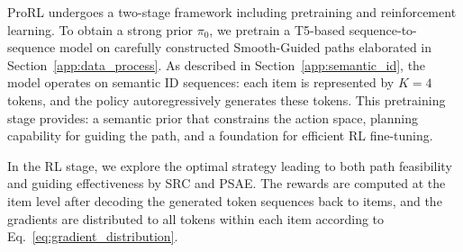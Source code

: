 ProRL undergoes a two-stage framework including pretraining and reinforcement learning. To obtain a strong prior $\pi_0$, we pretrain a T5-based sequence-to-sequence model on carefully constructed Smooth-Guided paths elaborated in Section~\ref{app:data_process}. As described in Section~\ref{app:semantic_id}, the model operates on semantic ID sequences: each item is represented by $K=4$ tokens, and the policy autoregressively generates these tokens. This pretraining stage provides: a semantic prior that constrains the action space, planning capability for guiding the path, and a foundation for efficient RL fine-tuning.

In the RL stage, we explore the optimal strategy leading to both path feasibility and guiding effectiveness by SRC and PSAE. The rewards are computed at the item level after decoding the generated token sequences back to items, and the gradients are distributed to all tokens within each item according to Eq.~\eqref{eq:gradient_distribution}.

